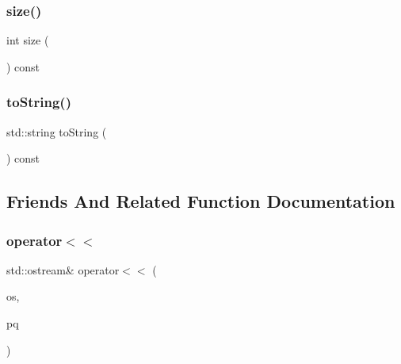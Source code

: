 \mbox{\label{classPriorityQueue_af9593d4a5ff4274efaf429cb4f9e57cc}} 
\subsubsection{\texorpdfstring{size()}{size()}}
{\footnotesize\ttfamily int size (\begin{DoxyParamCaption}{ }\end{DoxyParamCaption}) const}

\mbox{\label{classPriorityQueue_a1fe5121d6528fdea3f243321b3fa3a49}} 
\subsubsection{\texorpdfstring{to\+String()}{toString()}}
{\footnotesize\ttfamily std\+::string to\+String (\begin{DoxyParamCaption}{ }\end{DoxyParamCaption}) const}



\subsection{Friends And Related Function Documentation}
\mbox{\label{classPriorityQueue_a533f07b48057f32ab7e31e23fdd21675}} 
\subsubsection{\texorpdfstring{operator$<$$<$}{operator<<}}
{\footnotesize\ttfamily std\+::ostream\& operator$<$$<$ (\begin{DoxyParamCaption}\item[{std\+::ostream \&}]{os,  }\item[{const \mbox{\hyperlink{classPriorityQueue}{Priority\+Queue}}$<$ T $>$ \&}]{pq }\end{DoxyParamCaption})\hspace{0.3cm}{\ttfamily [friend]}}


